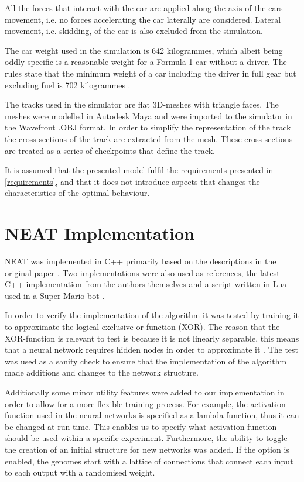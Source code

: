 \noindent
All the forces that interact with the car are applied along the axis of the cars movement, i.e. no forces accelerating the car laterally are considered. Lateral movement, i.e. skidding, of the car is also excluded from the simulation. 


The car weight used in the simulation is 642 kilogrammes, which albeit being oddly specific is a reasonable weight for a Formula 1 car without a driver. The rules state that the minimum weight of a car including the driver in full gear but excluding fuel is 702 kilogrammes \cite{f1_weight}.

The tracks used in the simulator are flat 3D-meshes with triangle faces. The meshes were modelled in Autodesk Maya and were imported to the simulator in the Wavefront .OBJ format. In order to simplify the representation of the track the cross sections of the track are extracted from the mesh. These cross sections are treated as a series of checkpoints that define the track.  

It is assumed that the presented model fulfil the requirements presented in \ref{requirements}, and that it does not introduce aspects that changes the characteristics of the optimal behaviour.


\section{NEAT Implementation}

NEAT was implemented in C++ primarily based on the descriptions in the original paper \cite{stanley:neat}. Two implementations were also used as references, the latest C++ implementation from the authors themselves \cite{neat_source} and a script written in Lua used in a Super Mario bot \cite{mario_source}. 

In order to verify the implementation of the algorithm it was tested by training it to approximate the logical exclusive-or function (XOR). The reason that the XOR-function is relevant to test is because it is not linearly separable, this means that a neural network requires hidden nodes in order to approximate it \cite{haykin:xor, stanley:neat}. The test was used as a sanity check to ensure that the implementation of the algorithm made additions and changes to the network structure. 

Additionally some minor utility features were added to our implementation in order to allow for a more flexible training process. For example, the activation function used in the neural networks is specified as a lambda-function, thus it can be changed at run-time. This enables us to specify what activation function should be used within a specific experiment. Furthermore, the ability to toggle the creation of an initial structure for new networks was added. If the option is enabled, the genomes start with a lattice of connections that connect each input to each output with a randomised weight.

